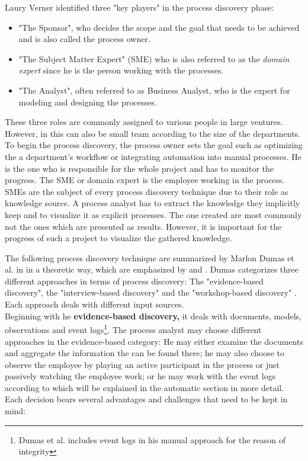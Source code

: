 Laury Verner identified three "key players" \cite{Verner2004} in the process discovery phase: 
\begin{itemize}
\item "The Sponsor", who decides the scope and the goal that needs to be achieved and is also called the process owner.
\item "The Subject Matter Expert" (SME) who is also referred to as the \textit{domain expert} since he is the person working with the processes.
\item "The Analyst", often referred to as Business Analyst, who is the expert for modeling and designing the processes. 
\end{itemize}

These three roles are commonly assigned to various people in large ventures. However, in this can also be small team according to the size of the departments. 
To begin the process discovery, the process owner sets the goal such as optimizing the a department's workflow or integrating automation into manual processes. He is the one who is responsible for the whole project and has to monitor the progress. 
The SME or domain expert is the employee working in the process. SMEs are the subject of every process discovery technique due to their role as knowledge source. A process analyst has to extract the knowledge they implicitly keep and to visualize it as explicit processes. The one created are most commonly not the ones which are presented as results. However, it is important for the progress of such a project to visualize the gathered knowledge. 

The following process discovery technique are summarized by Marlon Dumas et al. in \cite{Dumas2013} in a theoretic way, which are emphasized by \cite{Verner2004} and \cite{Jadhav2011}. 
Dumas categorizes three different approaches in terms of process discovery: The "evidence-based discovery", the "interview-based discovery" and the "workshop-based discovery" \cite{Dumas2013}. Each approach deals with different input sources. \\
Beginning with he \textbf{evidence-based discovery,} it deals with documents, models, observations and event logs\footnote{Dumas et al. includes event logs in his manual approach for the reason of integrity}. The process analyst may choose different approaches in the evidence-based category: He may either examine the documents and aggregate the information the can be found there; he may also choose to observe the employee by playing an active participant in the process or just passively watching the employee work; or he may work with the event logs according to \cite{Dumas2013} which will be explained in the automatic section in more detail. 
Each decision bears several advantages and challenges that need to be kept in mind: 


